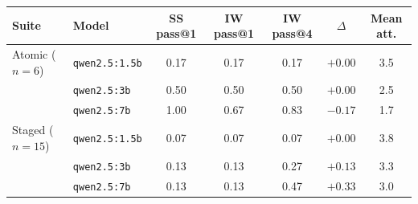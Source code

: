 \begin{tabular}{llccccc}
\toprule
Suite & Model & SS pass@1 & IW pass@1 & IW pass@4 & $\Delta$ & Mean att. \\
\midrule
Atomic ($n=6$) & \texttt{qwen2.5:1.5b} & 0.17 & 0.17 & 0.17 & $+0.00$ & 3.5 \\
 & \texttt{qwen2.5:3b} & 0.50 & 0.50 & 0.50 & $+0.00$ & 2.5 \\
 & \texttt{qwen2.5:7b} & 1.00 & 0.67 & 0.83 & $-0.17$ & 1.7 \\
\midrule
Staged ($n=15$) & \texttt{qwen2.5:1.5b} & 0.07 & 0.07 & 0.07 & $+0.00$ & 3.8 \\
 & \texttt{qwen2.5:3b} & 0.13 & 0.13 & 0.27 & $+0.13$ & 3.3 \\
 & \texttt{qwen2.5:7b} & 0.13 & 0.13 & 0.47 & $+0.33$ & 3.0 \\
\bottomrule
\end{tabular}
